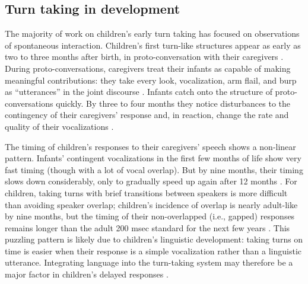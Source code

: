 \documentclass[authoryear, 12pt]{elsarticle}
\begin{document}
\subsection*{Turn taking in development}


The majority of work on children's early turn taking has focused on observations of spontaneous interaction. Children's first turn-like structures appear as early as two to three months after birth, in proto-conversation with their caregivers \citep{bruner1975, bruner1985, snow1977}. During proto-conversations, caregivers treat their infants as capable of making meaningful contributions: they take every look, vocalization, arm flail, and burp as ``utterances'' in the joint discourse \citep{bateson1975, jaffe2001, snow1977}. Infants catch onto the structure of proto-conversations quickly. By three to four months they notice disturbances to the contingency of their caregivers' response and, in reaction, change the rate and quality of their vocalizations \citep{k-bloom1988, masataka1993, toda1993}.


The timing of children's responses to their caregivers' speech shows a non-linear pattern. Infants' contingent vocalizations in the first few months of life show very fast timing (though with a lot of vocal overlap). But by nine months, their timing slows down considerably, only to gradually speed up again after 12 months \citep{hilbrink2015}. For children, taking turns with brief transitions between speakers is more difficult than avoiding speaker overlap; children's incidence of overlap is nearly adult-like by nine months, but the timing of their non-overlapped (i.e., gapped) responses remains longer than the adult 200 msec standard for the next few years \citep{casillas2016, garvey1984, garvey1981, ervin-tripp1979}. This puzzling pattern is likely due to children's linguistic development: taking turns on time is easier when their response is a simple vocalization rather than a linguistic utterance. Integrating language into the turn-taking system may therefore be a major factor in children's delayed responses \citep{casillas2016}.
\end{document}
